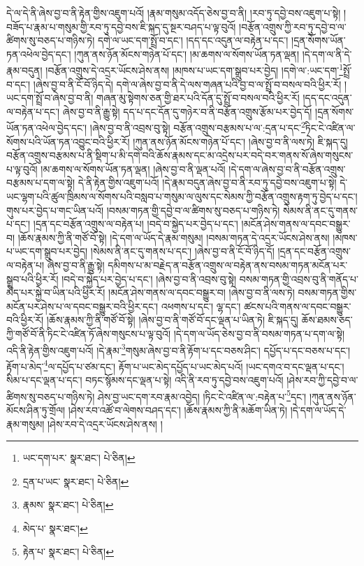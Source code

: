 དེ་ལ་དེ་ནི་ཞེས་བྱ་བ་ནི་རྟེན་གྱིས་འཇུག་པའོ། །རྣམ་གསུམ་འདོད་ཅེས་བྱ་བ་ནི། །རབ་ཏུ་དབྱེ་བས་འཇུག་པ་སྟེ། །བཟོད་པ་རྣམ་པ་གསུམ་གྱི་རབ་ཏུ་དབྱེ་བས་ཇི་སྐད་དུ་སྔར་བཤད་པ་ལྟ་བུའོ། །བརྩོན་འགྲུས་ཀྱི་རབ་ཏུ་དབྱེ་བ་ལ་ཚིགས་སུ་བཅད་པ་གཉིས་ཏེ། དགེ་ལ་ཡང་དག་སྤྲོ་བ་དང་། །དད་དང་འདུན་ལ་བརྟེན་པ་དང་། །དྲན་སོགས་ཡོན་ཏན་འཕེལ་བྱེད་དང་། །ཀུན་ནས་ཉོན་མོངས་གཉེན་པོ་དང་། །མ་ཆགས་ལ་སོགས་ཡོན་ཏན་ལྡན། །དེ་དག་ལ་ནི་དེ་རྣམ་བདུན། །བརྩོན་འགྲུས་དེ་འདྲར་ཡོངས་ཤེས་ནས། །མཁས་པ་ཡང་དག་སྒྲུབ་པར་བྱེད། །དགེ་ལ་:ཡང་དག་\footnote{ཡང་དག་པར་  སྣར་ཐང་།  པེ་ཅིན། }སྤྲོ་བ་དང་། །ཞེས་བྱ་བ་ནི་ངོ་བོ་ཉིད་དེ། དགེ་ལ་ཞེས་བྱ་བ་ནི་དེ་ལས་གཞན་པའི་བྱ་བ་ལ་སྤྲོ་བ་བསལ་བའི་ཕྱིར་རོ། །ཡང་དག་སྤྲོ་བ་ཞེས་བྱ་བ་ནི། གཞན་མུ་སྟེགས་ཅན་གྱི་ཐར་པའི་དོན་དུ་སྤྲོ་བ་བསལ་བའི་ཕྱིར་རོ། །དད་དང་འདུན་ལ་བརྟེན་པ་དང་། ཞེས་བྱ་བ་ནི་རྒྱུ་སྟེ། དད་པ་དང་དོན་དུ་གཉེར་བ་ནི་བརྩོན་འགྲུས་རྩོམ་པར་བྱེད་དོ། །དྲན་སོགས་ཡོན་ཏན་འཕེལ་བྱེད་དང་། །ཞེས་བྱ་བ་ནི་འབྲས་བུ་སྟེ། བརྩོན་འགྲུས་བརྩམས་པ་ལ་:དྲན་པ་དང་\footnote{དྲན་པ་ཡང་  སྣར་ཐང་།  པེ་ཅིན། }ཏིང་ངེ་འཛིན་ལ་སོགས་པའི་ཡོན་ཏན་འབྱུང་བའི་ཕྱིར་རོ། །ཀུན་ནས་ཉོན་མོངས་གཉེན་པོ་དང་། །ཞེས་བྱ་བ་ནི་ལས་ཏེ། ཇི་སྐད་དུ། བརྩོན་འགྲུས་བརྩམས་པ་ནི་སྡིག་པ་མི་དགེ་བའི་ཆོས་རྣམས་དང་མ་འདྲེས་པར་བདེ་བར་གནས་སོ་ཞེས་གསུངས་པ་ལྟ་བུའོ། །མ་ཆགས་ལ་སོགས་ཡོན་ཏན་ལྡན། །ཞེས་བྱ་བ་ནི་ལྡན་པའོ། །དེ་དག་ལ་ཞེས་བྱ་བ་ནི་བརྩོན་འགྲུས་བརྩམས་པ་དག་ལ་སྟེ། དེ་ནི་རྟེན་གྱིས་འཇུག་པའོ། །དེ་རྣམ་བདུན་ཞེས་བྱ་བ་ནི་རབ་ཏུ་དབྱེ་བས་འཇུག་པ་སྟེ། དེ་ཡང་ལྷག་པའི་ཚུལ་ཁྲིམས་ལ་སོགས་པའི་བསླབ་པ་གསུམ་ལ་ལུས་དང་སེམས་ཀྱི་བརྩོན་འགྲུས་རྟག་ཏུ་བྱེད་པ་དང་། གུས་པར་བྱེད་པ་གང་ཡིན་པའོ། །བསམ་གཏན་གྱི་དབྱེ་བ་ལ་ཚིགས་སུ་བཅད་པ་གཉིས་ཏེ། སེམས་ནི་ནང་དུ་གནས་པ་དང་། །དྲན་དང་བརྩོན་འགྲུས་ལ་བརྟེན་པ། །བདེ་བ་སྐྱེད་པར་བྱེད་པ་དང་། །མངོན་ཤེས་གནས་ལ་དབང་བསྒྱུར་བ། །ཆོས་རྣམས་ཀྱི་ནི་གཙོ་བོ་སྟེ། །དེ་དག་ལ་ཡོད་དེ་རྣམ་གསུམ། །བསམ་གཏན་དེ་འདྲར་ཡོངས་ཤེས་ནས། །མཁས་པ་ཡང་དག་སྒྲུབ་པར་བྱེད། །སེམས་ནི་ནང་དུ་གནས་པ་དང་། །ཞེས་བྱ་བ་ནི་ངོ་བོ་ཉིད་དོ། །དྲན་དང་བརྩོན་འགྲུས་ལ་བརྟེན་པ། ཞེས་བྱ་བ་ནི་རྒྱུ་སྟེ། དམིགས་པ་མ་བརྗེད་ན་བརྩོན་འགྲུས་ལ་བརྟེན་ནས་བསམ་གཏན་མངོན་པར་སྒྲུབ་པའི་ཕྱིར་རོ། །བདེ་བ་སྐྱེད་པར་བྱེད་པ་དང་། །ཞེས་བྱ་བ་ནི་འབྲས་བུ་སྟེ། བསམ་གཏན་གྱི་འབྲས་བུ་ནི་གནོད་པ་མེད་པར་སྐྱེ་བ་ཡིན་པའི་ཕྱིར་རོ། །མངོན་ཤེས་གནས་ལ་དབང་བསྒྱུར་བ། །ཞེས་བྱ་བ་ནི་ལས་ཏེ། བསམ་གཏན་གྱིས་མངོན་པར་ཤེས་པ་ལ་དབང་བསྒྱུར་བའི་ཕྱིར་དང་། འཕགས་པ་དང་། ལྷ་དང་། ཚངས་པའི་གནས་ལ་དབང་བསྒྱུར་བའི་ཕྱིར་རོ། །ཆོས་རྣམས་ཀྱི་ནི་གཙོ་བོ་སྟེ། །ཞེས་བྱ་བ་ནི་གཙོ་བོ་དང་ལྡན་པ་ཡིན་ཏེ། ཇི་སྐད་དུ། ཆོས་ཐམས་ཅད་ཀྱི་གཙོ་བོ་ནི་ཏིང་ངེ་འཛིན་ཏོ་ཞེས་གསུངས་པ་ལྟ་བུའོ། །དེ་དག་ལ་ཡོད་ཅེས་བྱ་བ་ནི་བསམ་གཏན་པ་དག་ལ་སྟེ། འདི་ནི་རྟེན་གྱིས་འཇུག་པའོ། །དེ་རྣམ་\footnote{རྣམས་  སྣར་ཐང་།  པེ་ཅིན། }གསུམ་ཞེས་བྱ་བ་ནི་རྟོག་པ་དང་བཅས་ཤིང་། དཔྱོད་པ་དང་བཅས་པ་དང་། རྟོག་པ་མེད་\footnote{མེད་པ་  སྣར་ཐང་། }ལ་དཔྱོད་པ་ཙམ་དང་། རྟོག་པ་ཡང་མེད་དཔྱོད་པ་ཡང་མེད་པའོ། །ཡང་དགའ་བ་དང་ལྡན་པ་དང་། སིམ་པ་དང་ལྡན་པ་དང་། བཏང་སྙོམས་དང་ལྡན་པ་སྟེ། འདི་ནི་རབ་ཏུ་དབྱེ་བས་འཇུག་པའོ། །ཤེས་རབ་ཀྱི་དབྱེ་བ་ལ་ཚིགས་སུ་བཅད་པ་གཉིས་ཏེ། ཤེས་བྱ་ཡང་དག་རབ་རྣམ་འབྱེད། །ཏིང་ངེ་འཛིན་ལ་:བརྟེན་པ་\footnote{རྟེན་པ་  སྣར་ཐང་།  པེ་ཅིན། }དང་། །ཀུན་ནས་ཉོན་མོངས་ཤིན་ཏུ་གྲོལ། །ཤེས་རབ་འཚོ་བ་ལེགས་བཤད་དང་། །ཆོས་རྣམས་ཀྱི་ནི་མཆོག་ཡིན་ཏེ། །དེ་དག་ལ་ཡོད་དེ་རྣམ་གསུམ། །ཤེས་རབ་དེ་འདྲར་ཡོངས་ཤེས་ནས། །
